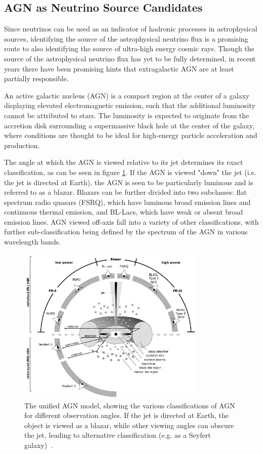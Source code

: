 \subsection{AGN as Neutrino Source Candidates}
Since neutrinos can be used as an indicator of hadronic processes in astrophysical sources, identifying the source of the astrophysical neutrino flux is a promising route to also identifying the source of ultra-high energy cosmic rays. Though the source of the astrophysical neutrino flux has yet to be fully determined, in recent years there have been promising hints that extragalactic AGN are at least partially responsible.

An active galactic nucleus (AGN) is a compact region at the center of a galaxy displaying elevated electromagnetic emission, such that the additional luminosity cannot be attributed to stars. The luminosity is expected to originate from the accretion disk surrounding a supermassive black hole at the center of the galaxy, where conditions are thought to be ideal for high-energy particle acceleration and production.

The angle at which the AGN is viewed relative to its jet determines its exact classification, as can be seen in figure \ref{fig:AGNfig}. If the AGN is viewed "down" the jet (i.e. the jet is directed at Earth), the AGN is seen to be particularly luminous and is referred to as a blazar. Blazars can be further divided into two subclasses: flat spectrum radio quasars (FSRQ), which have luminous broad emission lines and continuous thermal emission, and BL-Lacs, which have weak or absent broad emission lines. AGN viewed off-axis fall into a variety of other classifications, with further sub-classification being defined by the spectrum of the AGN in various wavelength bands.

\begin{figure}[h]
\centering
\includegraphics[width=0.8\textwidth]{figs/AGNfig.png}
\caption{The unified AGN model, showing the various classifications of AGN for different observation angles. If the jet is directed at Earth, the object is viewed as a blazar, while other viewing angles can obscure the jet, leading to alternative classification (e.g. as a Seyfert galaxy)~\cite{AGN_model_src}. }
\label{fig:AGNfig}
\end{figure}

